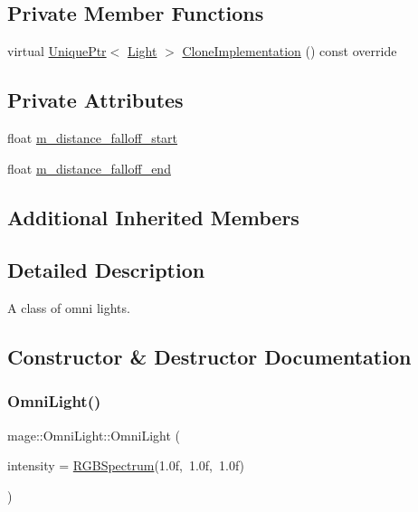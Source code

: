 \subsection*{Private Member Functions}
\begin{DoxyCompactItemize}
\item 
virtual \hyperlink{namespacemage_a3316d7143a973e37adf1110f2e80ca31}{Unique\+Ptr}$<$ \hyperlink{classmage_1_1_light}{Light} $>$ \hyperlink{classmage_1_1_omni_light_a1212457828cdd96cc7170767b7bd1223}{Clone\+Implementation} () const override
\end{DoxyCompactItemize}
\subsection*{Private Attributes}
\begin{DoxyCompactItemize}
\item 
float \hyperlink{classmage_1_1_omni_light_ab784744d39ad3d4f4a7b2214a55108f7}{m\+\_\+distance\+\_\+falloff\+\_\+start}
\item 
float \hyperlink{classmage_1_1_omni_light_a4ee5cc4103305dc96b43d6286858ef74}{m\+\_\+distance\+\_\+falloff\+\_\+end}
\end{DoxyCompactItemize}
\subsection*{Additional Inherited Members}


\subsection{Detailed Description}
A class of omni lights. 

\subsection{Constructor \& Destructor Documentation}
\hypertarget{classmage_1_1_omni_light_a94794dd7c19fcac0c0d0b9d83108513b}{}\label{classmage_1_1_omni_light_a94794dd7c19fcac0c0d0b9d83108513b} 
\subsubsection{\texorpdfstring{Omni\+Light()}{OmniLight()}\hspace{0.1cm}{\footnotesize\ttfamily [1/3]}}
{\footnotesize\ttfamily mage\+::\+Omni\+Light\+::\+Omni\+Light (\begin{DoxyParamCaption}\item[{const \hyperlink{structmage_1_1_r_g_b_spectrum}{R\+G\+B\+Spectrum} \&}]{intensity = {\ttfamily \hyperlink{structmage_1_1_r_g_b_spectrum}{R\+G\+B\+Spectrum}(1.0f,~1.0f,~1.0f)} }\end{DoxyParamCaption})\hspace{0.3cm}{\ttfamily [explicit]}}

